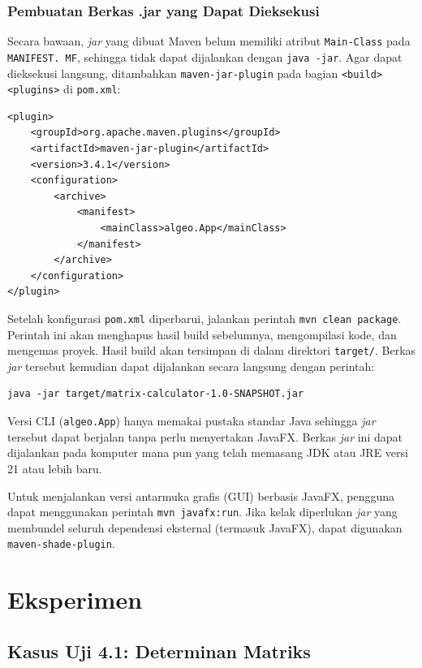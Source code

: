\documentclass[12pt,a4paper]{report}
\begin{document}
\subsection{Pembuatan Berkas .jar yang Dapat Dieksekusi}

Secara bawaan, \textit{jar} yang dibuat Maven belum memiliki atribut \texttt{Main-Class} pada \texttt{MANIFEST. \newline MF}, sehingga tidak dapat dijalankan dengan \texttt{java -jar}. Agar dapat dieksekusi langsung, ditambahkan \texttt{maven-jar-plugin} pada bagian \texttt{<build><plugins>} di \texttt{pom.xml}:

\begin{verbatim}
<plugin>
    <groupId>org.apache.maven.plugins</groupId>
    <artifactId>maven-jar-plugin</artifactId>
    <version>3.4.1</version>
    <configuration>
        <archive>
            <manifest>
                <mainClass>algeo.App</mainClass>
            </manifest>
        </archive>
    </configuration>
</plugin>
\end{verbatim}

Setelah konfigurasi \texttt{pom.xml} diperbarui, jalankan perintah \texttt{mvn clean package}. Perintah ini akan menghapus hasil build sebelumnya, mengompilasi kode, dan mengemas proyek. Hasil build akan tersimpan di dalam direktori \texttt{target/}. Berkas \textit{jar} tersebut kemudian dapat dijalankan secara langsung dengan perintah:

\begin{verbatim}
java -jar target/matrix-calculator-1.0-SNAPSHOT.jar
\end{verbatim}

Versi CLI (\texttt{algeo.App}) hanya memakai pustaka standar Java sehingga \textit{jar} tersebut dapat berjalan tanpa perlu menyertakan JavaFX. Berkas \textit{jar} ini dapat dijalankan pada komputer mana pun yang telah memasang JDK atau JRE versi 21 atau lebih baru. 

Untuk menjalankan versi antarmuka grafis (GUI) berbasis JavaFX, pengguna dapat menggunakan perintah \texttt{mvn javafx:run}. Jika kelak diperlukan \textit{jar} yang membundel seluruh dependensi eksternal (termasuk JavaFX), dapat digunakan \texttt{maven-shade-plugin}.

\chapter{Eksperimen}

\section{Kasus Uji 4.1: Determinan Matriks}
\end{document}
